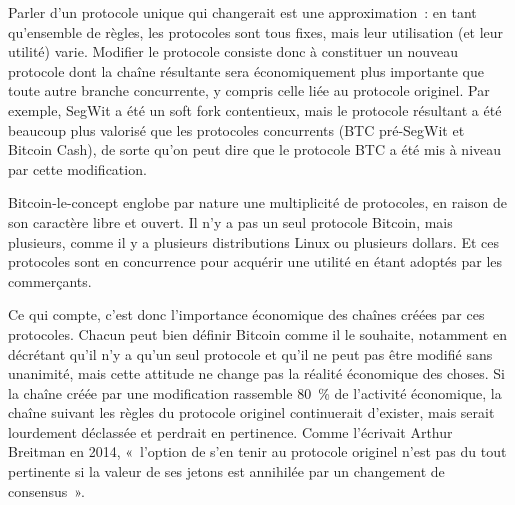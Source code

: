 Parler d'un protocole unique qui changerait est une approximation~: en tant qu'ensemble de règles, les protocoles sont tous fixes, mais leur utilisation (et leur utilité) varie. Modifier le protocole consiste donc à constituer un nouveau protocole dont la chaîne résultante sera économiquement plus importante que toute autre branche concurrente, y compris celle liée au protocole originel. Par exemple, SegWit a été un soft fork contentieux, mais le protocole résultant a été beaucoup plus valorisé que les protocoles concurrents (BTC pré-SegWit et Bitcoin Cash), de sorte qu'on peut dire que le protocole BTC a été mis à niveau par cette modification. %

Bitcoin-le-concept englobe par nature une multiplicité de protocoles, en raison de son caractère libre et ouvert. Il n'y a pas un seul protocole Bitcoin, mais plusieurs, comme il y a plusieurs distributions Linux ou plusieurs dollars. Et ces protocoles sont en concurrence pour acquérir une utilité en étant adoptés par les commerçants.

Ce qui compte, c'est donc l'importance économique des chaînes créées par ces protocoles. Chacun peut bien définir Bitcoin comme il le souhaite, notamment en décrétant qu'il n'y a qu'un seul protocole et qu'il ne peut pas être modifié sans unanimité, mais cette attitude ne change pas la réalité économique des choses. Si la chaîne créée par une modification rassemble 80~\% de l'activité économique, la chaîne suivant les règles du protocole originel continuerait d'exister, mais serait lourdement déclassée et perdrait en pertinence. Comme l'écrivait Arthur Breitman en 2014, «~l'option de s'en tenir au protocole originel n'est pas du tout pertinente si la valeur de ses jetons est annihilée par un changement de consensus~». %

